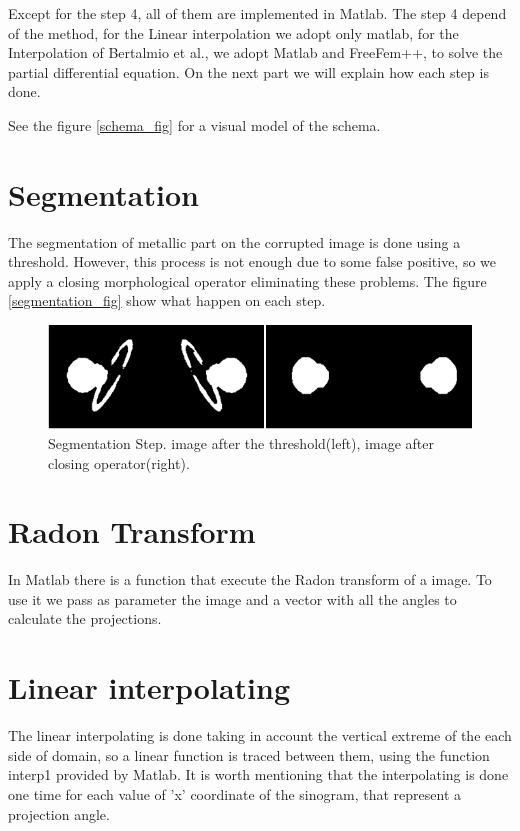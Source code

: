 Except for the step 4, all of them are implemented in Matlab. The step 4 depend of the method, for the Linear interpolation we adopt only matlab, for the Interpolation of Bertalmio et al., we adopt Matlab and FreeFem++, to solve the partial differential equation.
On the next part we will explain how each step is done.

See the figure \eqref{schema_fig} for a visual model of the schema.

\section{Segmentation}

The segmentation of metallic part on the corrupted image is done using a threshold. However, this process is not enough due to some false positive, so we apply a closing morphological operator eliminating these problems. The figure \eqref{segmentation_fig} show what happen on each step.

\begin{figure}[h]
\centering
\includegraphics[scale=0.7]{img/segmentation}
\caption{{Segmentation Step. image after the threshold(left), image after closing operator(right).}}\label{segmentation_fig}
\end{figure}

\section{Radon Transform}
In Matlab there is a function that execute the Radon transform of a image. To use it we pass as parameter the image and a vector with all the angles to calculate the projections.

\section{Linear interpolating}
The linear interpolating is done taking in account the vertical extreme of the each side of domain, so a linear function is traced between them, using the function interp1 provided by Matlab. It is worth mentioning that the interpolating is done one time for each value of 'x' coordinate of the sinogram, that represent a projection angle.

